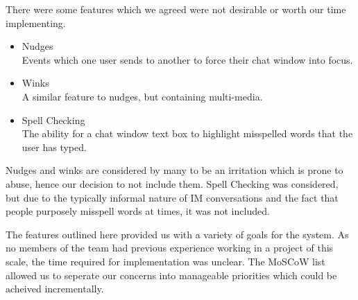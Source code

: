 There were some features which we agreed were not desirable or worth our time implementing.

\begin{itemize}

\item{Nudges\\
	Events which one user sends to another to force their chat window into focus.}
\item{Winks\\
	A similar feature to nudges, but containing multi-media.}
\item{Spell Checking\\
	The ability for a chat window text box to highlight misspelled words that the user has typed.}

\end{itemize}

Nudges and winks are considered by many to be an irritation which is prone to abuse, hence our decision to not include them. Spell Checking was considered, but due to the typically informal nature of IM conversations and the fact that people purposely misspell words at times, it was not included.

The features outlined here provided us with a variety of goals for the system. As no members of the team had previous experience working in a project of this scale, the time required for implementation was unclear. The MoSCoW list allowed us to seperate our concerns into manageable priorities which could be acheived incrementally.

